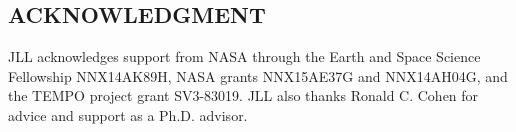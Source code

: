 \documentclass[a4paper,10pt,oneside]{article}
\begin{document}
\begin{sloppy}
\section{ACKNOWLEDGMENT}
\label{sec:ack}

JLL acknowledges support from NASA through the Earth and Space Science Fellowship NNX14AK89H, NASA grants NNX15AE37G and NNX14AH04G, and the TEMPO project grant SV3-83019.  JLL also thanks Ronald C. Cohen for advice and support as a Ph.D. advisor.






\end{sloppy}
\end{document}
